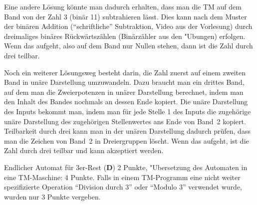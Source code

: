 \begin{loesung}
\begin{center}
\end{center}

Eine andere Lösung könnte man dadurch erhalten, dass man die TM
auf dem Band von der Zahl 3 (binär 11) subtrahieren lässt. Dies
kann nach dem Muster der binären Addition (``schriftliche'' Subtraktion,
Video aus der Vorlesung)
durch dreimaliges binäres Rückwärtszählen (Binärzähler aus den
"Ubungen) erfolgen.
Wenn
das aufgeht, also auf dem Band nur Nullen stehen, dann ist die
Zahl durch drei teilbar.

Noch ein weiterer Lösungsweg besteht darin, die Zahl zuerst auf einem zweiten
Band in unäre Darstellung umzuwandeln. Dazu braucht man ein drittes Band,
auf dem man die Zweierpotenzen in unärer Darstellung berechnet, indem
man den Inhalt des Bandes nochmals an dessen Ende kopiert. Die unäre
Darstellung des Inputs bekommt man, indem man für jede Stelle 1
des Inputs die zugehörige unäre Darstellung des zugehörigen Stellenwertes
ans Ende von Band~2 kopiert. Teilbarkeit durch drei kann man in der
unären Darstellung dadurch prüfen, dass man die Zeichen von Band~2
in Dreiergruppen löscht. Wenn das aufgeht, ist die Zahl durch drei teilbar
und kann akzeptiert werden.
\end{loesung}

\begin{bewertung}
Endlicher Automat für 3er-Rest ({\bf D}) 2 Punkte,
"Ubersetzung des Automaten in eine TM-Maschine: 4 Punkte.
Falls in einem TM-Programm eine nicht weiter spezifizierte Operation
``Division durch 3'' oder ``Modulo 3'' verwendet wurde, wurden
nur 3 Punkte vergeben.
\end{bewertung}
